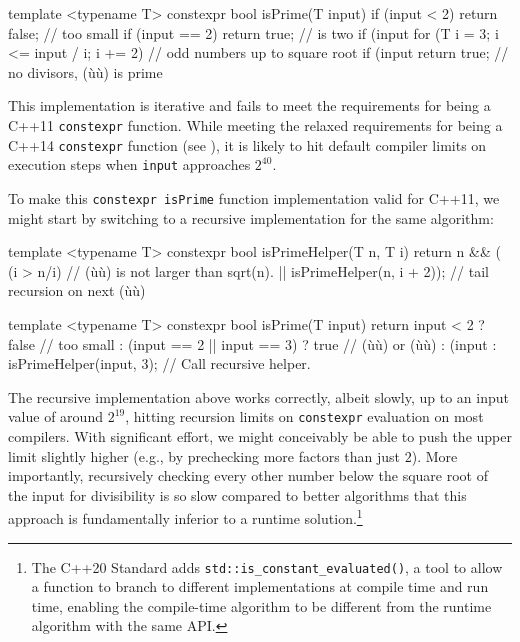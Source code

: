 \begin{emcppslisting}[emcppsstandards={c++14}]
template <typename T>
constexpr bool isPrime(T input)
{
    if (input < 2) return false;               // too small
    if (input == 2) return true;               // is two
    if (input %
    for (T i = 3; i <= input / i; i += 2)      // odd numbers up to square root
    {
        if (input %
    }
    return true;                               // no divisors, (ù{}ù) is prime
}
\end{emcppslisting}
    

\noindent This implementation is iterative and fails to meet the requirements for
being a C++11 \lstinline!constexpr! function. While meeting the relaxed
requirements for being a C++14 \lstinline!constexpr! function (see
), it is likely to hit default compiler
limits on execution steps when \lstinline!input! approaches $2^{40}$.

To make this \lstinline!constexpr!~\lstinline!isPrime! function implementation
valid for C++11, we might start by switching to a recursive
implementation for the same algorithm:

\begin{emcppslisting}
template <typename T>
constexpr bool isPrimeHelper(T n, T i)
{
    return n %
        && (   (i > n/i)                  // (ù{}ù) is not larger than sqrt(n).
            || isPrimeHelper(n, i + 2));  // tail recursion on next (ù{}ù)
}

template <typename T>
constexpr bool isPrime(T input)
{
    return input < 2                  ? false  // too small
         : (input == 2 || input == 3) ? true   // (ù{}ù) or (ù{}ù)
         : (input %
         : isPrimeHelper(input, 3);            // Call recursive helper.
}
\end{emcppslisting}
    

\noindent The recursive implementation above works correctly, albeit slowly, up to
an input value of around $2^{19}$, hitting recursion limits on
\lstinline!constexpr! evaluation on most compilers. With significant
effort, we might conceivably be able to push the upper limit slightly
higher (e.g., by prechecking more factors than just $2$). More
importantly, recursively checking every other number below the square
root of the input for divisibility is so slow compared to better
algorithms that this approach is fundamentally inferior to a runtime
solution.{\cprotect\footnote{The C++20 Standard adds
\lstinline!std::is_constant_evaluated()!, a tool to allow a function to
branch to different implementations at compile time and run time,
enabling the compile-time algorithm to be different from the runtime
  algorithm with the same API.}}

